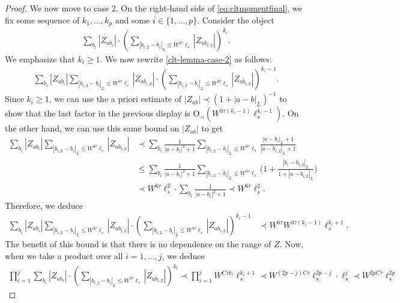 \begin{proof}
{We now move to case $2$. On the right-hand side of \eqref{eq:cltmomentfinal}, we fix some sequence of $k_{1},\ldots,k_{p}$ and some $i\in\{1,\ldots,p\}$. Consider the object
%
\begin{align}
\sum_{b_{i}}|Z_{ab_{i}}|\cdot \left(\sum_{|b_{i,2}-b_{i}|_{L}\leq W^{3\tau}\ell_{s}}|Z_{ab_{i,2}}|\right)^{k_{i}}.\label{clt-lemma-case-2}   
\end{align}
%
We emphasize that $k_{i}\geq1$. We now rewrite \eqref{clt-lemma-case-2} as follows:
%
\begin{align*}
\sum_{b_{i}}|Z_{ab_{i}}|\sum_{|b_{i,2}-b_{i}|_{L}\leq W^{3\tau}\ell_{s}}|Z_{ab_{i,2}}|\cdot\left(\sum_{|b_{i,2}-b_{i}|_{L}\leq W^{3\tau}\ell_{s}}|Z_{ab_{i,2}}|\right)^{k_{i}-1}.
\end{align*}
%
Since $k_{i}\geq1$, we can use the a priori estimate of $|Z_{ab}|\prec(1+|a-b|_{L})^{-1}$ to show that the last factor in the previous display is $\mathrm{O}_{\prec}(W^{3\tau(k_{i}-1)}\ell_{s}^{k_{i}-1})$. On the other hand, we can use this same bound on $|Z_{ab}|$ to get
%
\begin{align*}
\sum_{b_{i}}|Z_{ab_{i}}|\sum_{|b_{i,2}-b_{i}|_{L}\leq W^{3\tau}\ell_{s}}|Z_{ab_{i,2}}|&\prec\sum_{b_{i}}\frac{1}{|a-b_{i}|^{2}+1}\sum_{|b_{i,2}-b_{i}|_{L}\leq W^{3\tau}\ell_{s}}\frac{|a-b_{i}|_{L}+1}{|a-b_{i,2}|_{L}+1}\\
&\leq\sum_{b_{i}}\frac{1}{|a-b_{i}|^{2}+1}\sum_{|b_{i,2}-b_{i}|_{L}\leq W^{3\tau}\ell_{s}}\Big(1+\frac{|b_{i}-b_{i,2}|_{L}}{1+|a-b_{i,2}|_{L}}\Big)\\
&\prec W^{6\tau}\ell_{s}^{2} \cdot \sum_{b_{i}}\frac{1}{|a-b_{i}|^{2}+1}\prec W^{6\tau}\ell_{s}^{2}.
\end{align*}
%
Therefore, we deduce
%
\begin{align}
\sum_{b_{i}}|Z_{ab_{i}}|\sum_{|b_{i,2}-b_{i}|_{L}\leq W^{3\tau}\ell_{s}}|Z_{ab_{i,2}}|\cdot\left(\sum_{|b_{i,2}-b_{i}|_{L}\leq W^{3\tau}\ell_{s}}|Z_{ab_{i,2}}|\right)^{k_{i}-1}&\prec W^{6\tau}W^{3\tau(k_{i}-1)}\ell_{s}^{k_{i}+1}.
\end{align}
%
The benefit of this bound is that there is no dependence on the range of $Z$. Now, when we take a product over all $i=1,\ldots,j$, we deduce
%
\begin{align*}
\prod_{i=1}^{j}\sum_{b_{i}}|Z_{ab_{i}}|\cdot \left(\sum_{|b_{i,2}-b_{i}|_{L}\leq W^{3\tau}\ell_{s}}|Z_{ab_{i,2}}|\right)^{k_{i}}\prec \prod_{i=1}^{j} W^{C\tau k_{i}}\ell_{s}^{k_{i}+1}\prec W^{(2p-j)C\tau}\ell_{s}^{2p-j}\cdot\ell_{s}^{j}\prec W^{2pC\tau}\ell_{s}^{2p}
\end{align*}
}
\end{proof}
